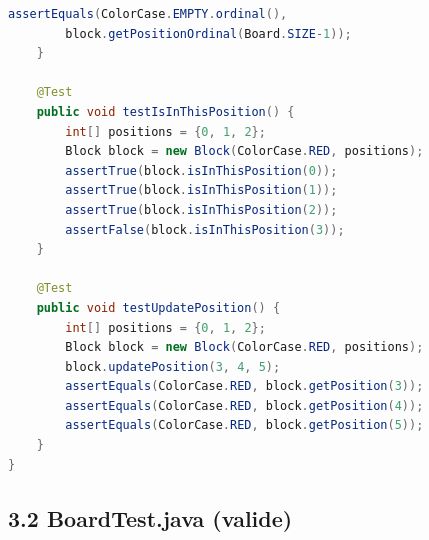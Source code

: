 \documentclass[a4paper,11pt]{article}
\begin{document}
\begin{lstlisting}[language=Java]
        assertEquals(ColorCase.EMPTY.ordinal(),
        block.getPositionOrdinal(Board.SIZE-1));
    }

    @Test
    public void testIsInThisPosition() {
        int[] positions = {0, 1, 2};
        Block block = new Block(ColorCase.RED, positions);
        assertTrue(block.isInThisPosition(0));
        assertTrue(block.isInThisPosition(1));
        assertTrue(block.isInThisPosition(2));
        assertFalse(block.isInThisPosition(3));
    }

    @Test
    public void testUpdatePosition() {
        int[] positions = {0, 1, 2};
        Block block = new Block(ColorCase.RED, positions);
        block.updatePosition(3, 4, 5);
        assertEquals(ColorCase.RED, block.getPosition(3));
        assertEquals(ColorCase.RED, block.getPosition(4));
        assertEquals(ColorCase.RED, block.getPosition(5));
    }
}

\end{lstlisting}

\subsection{3.2 BoardTest.java (valide)}
\end{document}
